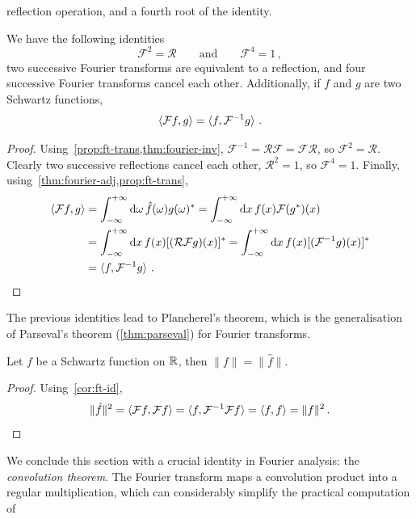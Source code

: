 reflection operation, and a fourth root of the identity.
\begin{corollary}
	\label{cor:ft-id}
	We have the following identities
	\begin{equation}
		\mathcal{F}^2=\mathcal{R}\qquad\text{and}\qquad\mathcal{F}^4=1\,,
	\end{equation}
	\ie two successive Fourier transforms are equivalent to a reflection, and four
	successive Fourier transforms cancel each other. Additionally, if $f$ and $g$ are two
	Schwartz functions,
	\begin{equation}
		\braket{\mathcal{F}f,g}=\braket{f,\mathcal{F}^{-1}g}\,.
	\end{equation}
\end{corollary}
\begin{proof}
	Using~\cref{prop:ft-trans,thm:fourier-inv},
	$\mathcal{F}^{-1}=\mathcal{R}\mathcal{F}=\mathcal{F}\mathcal{R}$, so
	$\mathcal{F}^2=\mathcal{R}$. Clearly two successive reflections cancel each other, \ie
	$\mathcal{R}^2=1$, so $\mathcal{F}^4=1$. Finally,
	using~\cref{thm:fourier-adj,prop:ft-trans},
	\begin{align}
		\braket{\mathcal{F}f,g} & =\int_{-\infty}^{+\infty}\mathrm{d}{\omega}\,\hat{f}(\omega)g(\omega)^*
		=\int_{-\infty}^{+\infty}\mathrm{d}{x}\,f(x)\mathcal{F}(g^*)(x)                                        \\
		                        & =\int_{-\infty}^{+\infty}\mathrm{d}{x}\,f(x)[(\mathcal{R}\mathcal{F}g)(x)]^*
		=\int_{-\infty}^{+\infty}\mathrm{d}{x}\,f(x)[(\mathcal{F}^{-1}g)(x)]^*                                 \\
		                        & =\braket{f,\mathcal{F}^{-1}g}\,.
	\end{align}
\end{proof}
The previous identities lead to Plancherel's theorem, which is the generalisation of
Parseval's theorem (\cref{thm:parseval}) for Fourier transforms.
\begin{theorem}[Plancherel]
	Let $f$ be a Schwartz function on $\mathbb{R}$, then $\|f\|=\|\hat{f}\|$.
\end{theorem}
\begin{proof}
	Using~\cref{cor:ft-id},
	\begin{equation}
		\|\hat{f}\|^2=\braket{\mathcal{F}f,\mathcal{F}f}
		=\braket{f,\mathcal{F}^{-1}\mathcal{F}f}
		=\braket{f,f}=\|f\|^2\,.
	\end{equation}
\end{proof}
We conclude this section with a crucial identity in Fourier analysis: the
\emph{convolution theorem}. The Fourier transform maps a convolution product into a
regular multiplication, which can considerably simplify the practical computation of
